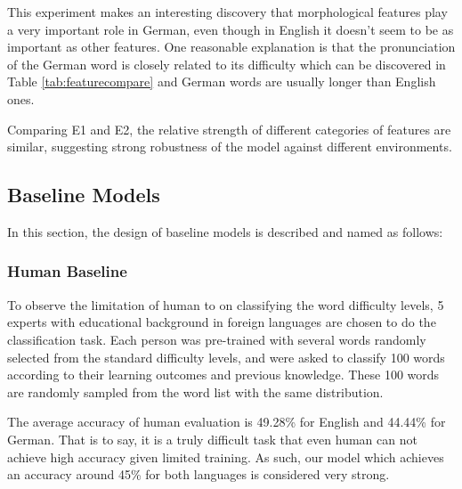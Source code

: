  This experiment makes an interesting discovery that
morphological features play a very important role in German, even though in English it doesn't seem to be as important as other features. 
One reasonable explanation is that the pronunciation of 
the German word is closely related to its difficulty which can be 
discovered in Table \ref{tab:featurecompare} and German words are usually 
longer than English ones.

Comparing E1 and E2, the relative strength of different categories
of features are similar, suggesting strong robustness of the model against
different environments.

\subsection{Baseline Models}
In this section, the design of baseline models is described and named as follows:
\subsubsection{Human Baseline}
To observe the limitation of human to on classifying the word difficulty levels, 5 experts with educational background in foreign languages are chosen to do the classification task. 
Each person was pre-trained with several words randomly selected from the standard difficulty levels, and were asked to classify 100 words according to their learning outcomes and previous knowledge.
These 100 words are randomly sampled from the word list with the same distribution.

The average accuracy of human evaluation is 49.28\% for English and 44.44\% for German.
That is to say, it is a truly difficult task that even human can not 
achieve high accuracy given limited training. As such, our model 
which achieves an accuracy around 45\% for both languages is considered
very strong.

